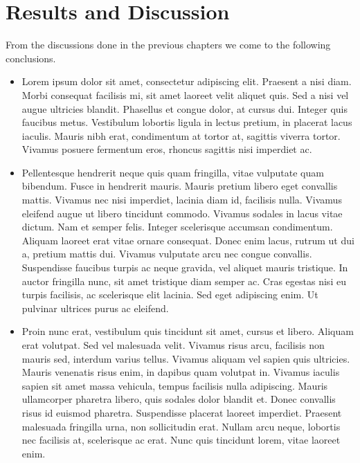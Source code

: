 \documentclass[titlepage,a4paper,12pt,thmsb]{report}
\begin{document}
\chapter{Results and Discussion}
From the discussions done in the previous chapters we come to the following conclusions.
\begin{itemize}

\item{Lorem ipsum dolor sit amet, consectetur adipiscing elit. Praesent a nisi diam. Morbi consequat facilisis mi, sit amet laoreet velit aliquet quis. Sed a nisi vel augue ultricies blandit. Phasellus et congue dolor, at cursus dui. Integer quis faucibus metus. Vestibulum lobortis ligula in lectus pretium, in placerat lacus iaculis. Mauris nibh erat, condimentum at tortor at, sagittis viverra tortor. Vivamus posuere fermentum eros, rhoncus sagittis nisi imperdiet ac.}

\item{Pellentesque hendrerit neque quis quam fringilla, vitae vulputate quam bibendum. Fusce in hendrerit mauris. Mauris pretium libero eget convallis mattis. Vivamus nec nisi imperdiet, lacinia diam id, facilisis nulla. Vivamus eleifend augue ut libero tincidunt commodo. Vivamus sodales in lacus vitae dictum. Nam et semper felis. Integer scelerisque accumsan condimentum. Aliquam laoreet erat vitae ornare consequat. Donec enim lacus, rutrum ut dui a, pretium mattis dui. Vivamus vulputate arcu nec congue convallis. Suspendisse faucibus turpis ac neque gravida, vel aliquet mauris tristique. In auctor fringilla nunc, sit amet tristique diam semper ac. Cras egestas nisi eu turpis facilisis, ac scelerisque elit lacinia. Sed eget adipiscing enim. Ut pulvinar ultrices purus ac eleifend.}

\item{Proin nunc erat, vestibulum quis tincidunt sit amet, cursus et libero. Aliquam erat volutpat. Sed vel malesuada velit. Vivamus risus arcu, facilisis non mauris sed, interdum varius tellus. Vivamus aliquam vel sapien quis ultricies. Mauris venenatis risus enim, in dapibus quam volutpat in. Vivamus iaculis sapien sit amet massa vehicula, tempus facilisis nulla adipiscing. Mauris ullamcorper pharetra libero, quis sodales dolor blandit et. Donec convallis risus id euismod pharetra. Suspendisse placerat laoreet imperdiet. Praesent malesuada fringilla urna, non sollicitudin erat. Nullam arcu neque, lobortis nec facilisis at, scelerisque ac erat. Nunc quis tincidunt lorem, vitae laoreet enim.}

\end{itemize}
\end{document}
